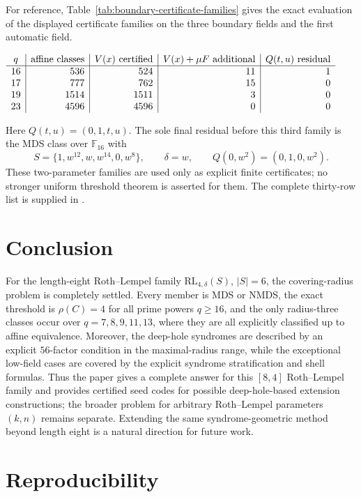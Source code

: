 \documentclass[11pt]{article}
\newcommand{\F}{\mathbb F}
\newcommand{\RL}{\mathrm{RL}}
\theoremstyle{plain}
\theoremstyle{definition}
\begin{document}
For reference, Table~\ref{tab:boundary-certificate-families} gives the
exact evaluation of the displayed certificate families on the three boundary
fields and the first automatic field.
\begin{center}
\label{tab:boundary-certificate-families}
\(
\begin{array}{c|r|r|r|r}
q&\hbox{affine classes}&V(x)\hbox{ certified}&
  V(x)+\mu F\hbox{ additional}&Q(t,u)\hbox{ residual}\\ \hline
16&536&524&11&1\\
17&777&762&15&0\\
19&1514&1511&3&0\\
23&4596&4596&0&0
\end{array}
\)
\end{center}
Here \(Q(t,u)=(0,1,t,u)\).  The sole final residual before this third
family is the MDS class over \(\F_{16}\) with
\[
 S=\{1,w^{12},w,w^{14},0,w^8\},\qquad
 \delta=w,\qquad Q(0,w^2)=(0,1,0,w^2).
\]
These two-parameter families are used only as explicit finite certificates;
no stronger uniform threshold theorem is asserted for them.
The complete thirty-row list is supplied in
.

\section{Conclusion}

For the length-eight Roth--Lempel family
\(\RL_{4,\delta}(S)\), \(|S|=6\), the covering-radius problem is completely
settled.  Every member is MDS or NMDS, the exact threshold is
\(\rho(C)=4\) for all prime powers \(q\ge16\), and the only radius-three
classes occur over \(q=7,8,9,11,13\), where they are all explicitly
classified up to affine equivalence.  Moreover, the deep-hole syndromes are
described by an explicit \(56\)-factor condition in the maximal-radius
range, while the exceptional low-field cases are covered by the explicit
syndrome stratification and shell formulas.  Thus the paper gives a complete
answer for this \([8,4]\) Roth--Lempel family and provides certified seed
codes for possible deep-hole-based extension constructions; the broader
problem for arbitrary Roth--Lempel parameters \((k,n)\) remains separate.
Extending the same syndrome-geometric method beyond length eight is a natural
direction for future work.

\section{Reproducibility}\label{sec:reproducibility}
\end{document}
